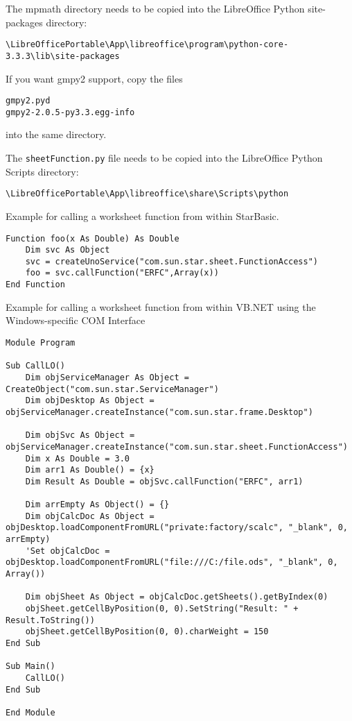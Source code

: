 The mpmath directory needs to be copied into the LibreOffice Python site-packages directory:
\begin{verbatim}
\LibreOfficePortable\App\libreoffice\program\python-core-3.3.3\lib\site-packages
\end{verbatim}
If you want gmpy2 support, copy the files 
\begin{verbatim}
gmpy2.pyd
gmpy2-2.0.5-py3.3.egg-info
\end{verbatim}
into the same directory.
	
The \verb|sheetFunction.py| file needs to be copied into the  LibreOffice Python Scripts directory:
\begin{verbatim}
\LibreOfficePortable\App\libreoffice\share\Scripts\python
\end{verbatim}


Example for calling a worksheet function from within StarBasic.

\begin{lstlisting}
Function foo(x As Double) As Double
	Dim svc As Object
	svc = createUnoService("com.sun.star.sheet.FunctionAccess")
	foo = svc.callFunction("ERFC",Array(x))
End Function
\end{lstlisting}



Example for calling a worksheet function from within VB.NET using the Windows-specific COM Interface

\begin{lstlisting}
Module Program

Sub CallLO()
	Dim objServiceManager As Object = CreateObject("com.sun.star.ServiceManager")
	Dim objDesktop As Object = objServiceManager.createInstance("com.sun.star.frame.Desktop")
	
	Dim objSvc As Object = objServiceManager.createInstance("com.sun.star.sheet.FunctionAccess")
	Dim x As Double = 3.0
	Dim arr1 As Double() = {x}
	Dim Result As Double = objSvc.callFunction("ERFC", arr1)
	
	Dim arrEmpty As Object() = {}
	Dim objCalcDoc As Object = objDesktop.loadComponentFromURL("private:factory/scalc", "_blank", 0, arrEmpty)
	'Set objCalcDoc = objDesktop.loadComponentFromURL("file:///C:/file.ods", "_blank", 0, Array())
	
	Dim objSheet As Object = objCalcDoc.getSheets().getByIndex(0)
	objSheet.getCellByPosition(0, 0).SetString("Result: " + Result.ToString())
	objSheet.getCellByPosition(0, 0).charWeight = 150        
End Sub

Sub Main()
	CallLO()
End Sub

End Module
\end{lstlisting}

